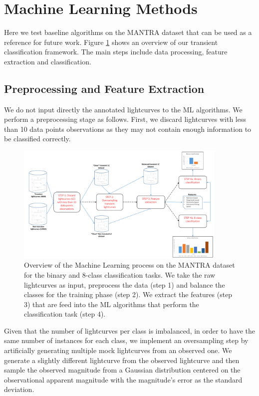 \documentclass[twocolumn]{aastex62}
\begin{document}
\section{Machine Learning Methods} 
\label{sec:ml_tests}
Here we test baseline algorithms on the MANTRA dataset that can be
used as a reference for future work.
Figure \ref{fig:ML} shows an overview of our transient classification framework.
The main steps include data processing, feature extraction and classification.  


\subsection{Preprocessing and Feature Extraction}

We do not input directly the annotated lightcurves to the ML algorithms.
We perform a preprocessing stage as follows. 
First, we discard lightcurves with less than 10 data points observations
as they may not contain enough information to be classified correctly.

\begin{figure}
\begin{center}
  \includegraphics[width=0.9\textwidth]{ML.pdf}
\end{center}
  \caption{Overview of the Machine Learning process on the MANTRA
    dataset for the binary and 8-class classification tasks. We take
    the raw lightcurves as input, preprocess the data (step 1) and
    balance the classes for the training phase (step 2). 
    We extract the features (step 3) that are feed into the ML
    algorithms that perform the classification task (step 4).}
  \label{fig:ML}
\end{figure} 


Given that the number of lightcurves per class is imbalanced, 
in order to have the same number of instances for each class, we implement an
oversampling step by artificially generating multiple mock lightcurves 
from an observed one. 
We generate a slightly different lightcurve from the observed lightcurve and 
then sample the observed magnitude from a Gaussian distribution
centered on the observational apparent magnitude with the magnitude's
error as the standard deviation. 
\end{document}
